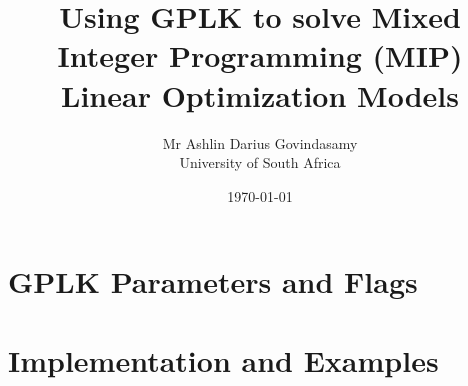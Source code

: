 \documentclass{report}
\title{Using GPLK to solve Mixed Integer Programming (MIP) Linear Optimization Models}
\author{Mr Ashlin Darius Govindasamy\\ \large{University of South Africa}}
\date{\today}
\begin{document}
\maketitle
\newpage




\tableofcontents



\chapter{GPLK Parameters and Flags}


\chapter{Implementation and Examples}



\newpage
\end{document}
